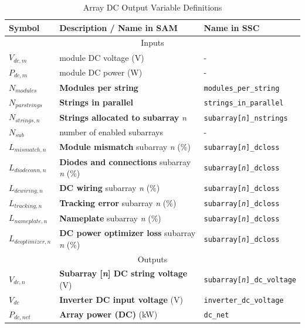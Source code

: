 \documentclass[12pt,letterpaper]{article}
\begin{document}
\begin{table}
\begin{center}
\caption{Array DC Output Variable Definitions}
\begin{tabular}{lll}
\midrule
Symbol & Description / \textbf{Name in SAM} & Name in SSC \\
\midrule
\multicolumn{3}{c}{Inputs}\\
$V_{dc,m}$ & module DC voltage (V)& - \\
$P_{dc,m}$ & module DC power (W) & - \\
$N_{modules}$ & \textbf{Modules per string} & \texttt{modules\_per\_string} \\
$N_{parstrings}$ & \textbf{Strings in parallel} & \texttt{strings\_in\_parallel} \\
$N_{strings,n}$ & \textbf{Strings allocated to subarray} \textit{n} & \texttt{subarray[\textit{n}]\_nstrings} \\
$N_{sub}$ & number of enabled subarrays & - \\
$L_{mismatch,n}$ & \textbf{Module mismatch} subarray \textit{n} (\%)&  \texttt{subarray[\textit{n}]\_dcloss} \\
$L_{diodeconn,n}$ & \textbf{Diodes and connections} subarray \textit{n} (\%)&  \texttt{subarray[\textit{n}]\_dcloss} \\
$L_{dcwiring,n}$ & \textbf{DC wiring} subarray \textit{n} (\%)&  \texttt{subarray[\textit{n}]\_dcloss} \\
$L_{tracking,n}$ & \textbf{Tracking error} subarray \textit{n} (\%)&  \texttt{subarray[\textit{n}]\_dcloss} \\
$L_{nameplate,n}$ & \textbf{Nameplate} subarray \textit{n} (\%)&  \texttt{subarray[\textit{n}]\_dcloss} \\
$L_{dcoptimizer,n}$ & \textbf{DC power optimizer loss} subarray \textit{n} (\%)&  \texttt{subarray[\textit{n}]\_dcloss} \\
\midrule
\multicolumn{3}{c}{Outputs}\\
$V_{dc,n}$ & \textbf{Subarray [\textit{n}] DC string voltage} (V)& \texttt{subarray[\textit{n}]\_dc\_voltage} \\
$V_{dc}$ & \textbf{Inverter DC input voltage} (V)& \texttt{inverter\_dc\_voltage} \\
$P_{dc,net}$ & \textbf{Array power (DC)} (kW)& \texttt{dc\_net} \\
\hline
\end{tabular}
\label{tab-arraydcoutputvars}
\end{center}
\end{table}
\end{document}
